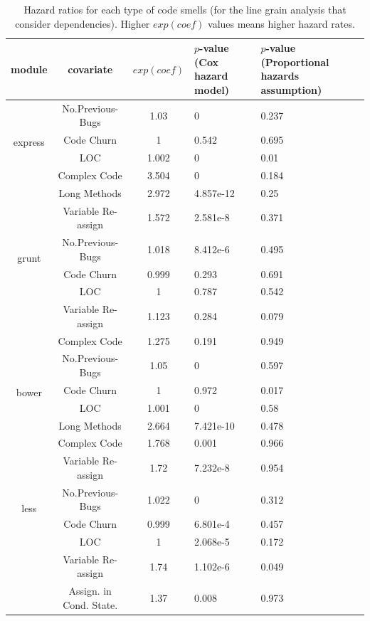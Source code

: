 \documentclass[smallcondensed]{svjour3}
\begin{document}
\begin{table}[t]
	\centering
	\scriptsize
	\caption{Hazard ratios for each type of code smells (for the line grain analysis that consider dependencies). Higher $exp(coef)$ values means higher hazard rates.}
	\begin{tabular}{c|c|c|p{1.1cm}|p{1.3cm}}
		\hline
		module & covariate & $exp(coef)$ & $p$-value (Cox hazard model) & $p$-value (Proportional hazards assumption) \\ \hline
		\multirow{4}{*}{express}
		& No.Previous-Bugs & 1.03 & 0 & 0.237 \\ \cline{2-5}
		& Code Churn & 1 & 0.542 & 0.695 \\ \cline{2-5}
		& LOC & 1.002 & 0 & 0.01 \\ \cline{2-5}
		& Complex Code & 3.504 & 0 & 0.184 \\ \cline{2-5}
		& Long Methods & 2.972 & 4.857e-12 & 0.25 \\ \cline{2-5}
		& Variable Re-assign & 1.572 & 2.581e-8 & 0.371 \\ \hline
		\multirow{2}{*}{grunt}
		& No.Previous-Bugs & 1.018 & 8.412e-6 & 0.495 \\ \cline{2-5}
		& Code Churn & 0.999 & 0.293 & 0.691 \\ \cline{2-5}
		& LOC & 1 & 0.787 & 0.542 \\ \cline{2-5}
		& Variable Re-assign & 1.123 & 0.284 & 0.079 \\ \cline{2-5}
		& Complex Code & 1.275 & 0.191 & 0.949 \\ \hline
		\multirow{4}{*}{bower}
		& No.Previous-Bugs & 1.05 & 0 & 0.597 \\ \cline{2-5}
		& Code Churn & 1 & 0.972 & 0.017 \\ \cline{2-5}
		& LOC & 1.001 & 0 & 0.58 \\ \cline{2-5}
		& Long Methods & 2.664 & 7.421e-10 & 0.478 \\ \cline{2-5}
		& Complex Code & 1.768 & 0.001 & 0.966 \\ \cline{2-5}
		& Variable Re-assign & 1.72 & 7.232e-8 & 0.954 \\ \hline
		\multirow{2}{*}{less}
		& No.Previous-Bugs & 1.022 & 0 & 0.312 \\ \cline{2-5}
		& Code Churn & 0.999 & 6.801e-4 & 0.457 \\ \cline{2-5}
		& LOC & 1 & 2.068e-5 & 0.172 \\ \cline{2-5}
		& Variable Re-assign & 1.74 & 1.102e-6 & 0.049 \\ \cline{2-5}
		& Assign. in Cond. State. & 1.37 & 0.008 & 0.973 \\ \hline

\end{tabular}
\end{table}
\end{document}
